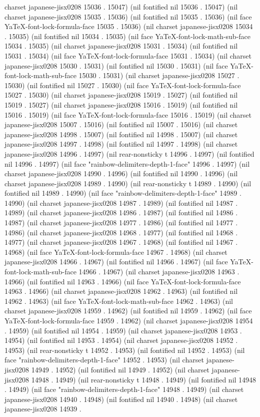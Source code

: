 charset japanese-jisx0208 15036 . 15047) (nil fontified nil 15036 . 15047) (nil charset japanese-jisx0208 15035 . 15036) (nil fontified nil 15035 . 15036) (nil face YaTeX-font-lock-formula-face 15035 . 15036) (nil charset japanese-jisx0208 15034 . 15035) (nil fontified nil 15034 . 15035) (nil face YaTeX-font-lock-math-sub-face 15034 . 15035) (nil charset japanese-jisx0208 15031 . 15034) (nil fontified nil 15031 . 15034) (nil face YaTeX-font-lock-formula-face 15031 . 15034) (nil charset japanese-jisx0208 15030 . 15031) (nil fontified nil 15030 . 15031) (nil face YaTeX-font-lock-math-sub-face 15030 . 15031) (nil charset japanese-jisx0208 15027 . 15030) (nil fontified nil 15027 . 15030) (nil face YaTeX-font-lock-formula-face 15027 . 15030) (nil charset japanese-jisx0208 15019 . 15027) (nil fontified nil 15019 . 15027) (nil charset japanese-jisx0208 15016 . 15019) (nil fontified nil 15016 . 15019) (nil face YaTeX-font-lock-formula-face 15016 . 15019) (nil charset japanese-jisx0208 15007 . 15016) (nil fontified nil 15007 . 15016) (nil charset japanese-jisx0208 14998 . 15007) (nil fontified nil 14998 . 15007) (nil charset japanese-jisx0208 14997 . 14998) (nil fontified nil 14997 . 14998) (nil charset japanese-jisx0208 14996 . 14997) (nil rear-nonsticky t 14996 . 14997) (nil fontified nil 14996 . 14997) (nil face "rainbow-delimiters-depth-1-face" 14996 . 14997) (nil charset japanese-jisx0208 14990 . 14996) (nil fontified nil 14990 . 14996) (nil charset japanese-jisx0208 14989 . 14990) (nil rear-nonsticky t 14989 . 14990) (nil fontified nil 14989 . 14990) (nil face "rainbow-delimiters-depth-1-face" 14989 . 14990) (nil charset japanese-jisx0208 14987 . 14989) (nil fontified nil 14987 . 14989) (nil charset japanese-jisx0208 14986 . 14987) (nil fontified nil 14986 . 14987) (nil charset japanese-jisx0208 14977 . 14986) (nil fontified nil 14977 . 14986) (nil charset japanese-jisx0208 14968 . 14977) (nil fontified nil 14968 . 14977) (nil charset japanese-jisx0208 14967 . 14968) (nil fontified nil 14967 . 14968) (nil face YaTeX-font-lock-formula-face 14967 . 14968) (nil charset japanese-jisx0208 14966 . 14967) (nil fontified nil 14966 . 14967) (nil face YaTeX-font-lock-math-sub-face 14966 . 14967) (nil charset japanese-jisx0208 14963 . 14966) (nil fontified nil 14963 . 14966) (nil face YaTeX-font-lock-formula-face 14963 . 14966) (nil charset japanese-jisx0208 14962 . 14963) (nil fontified nil 14962 . 14963) (nil face YaTeX-font-lock-math-sub-face 14962 . 14963) (nil charset japanese-jisx0208 14959 . 14962) (nil fontified nil 14959 . 14962) (nil face YaTeX-font-lock-formula-face 14959 . 14962) (nil charset japanese-jisx0208 14954 . 14959) (nil fontified nil 14954 . 14959) (nil charset japanese-jisx0208 14953 . 14954) (nil fontified nil 14953 . 14954) (nil charset japanese-jisx0208 14952 . 14953) (nil rear-nonsticky t 14952 . 14953) (nil fontified nil 14952 . 14953) (nil face "rainbow-delimiters-depth-1-face" 14952 . 14953) (nil charset japanese-jisx0208 14949 . 14952) (nil fontified nil 14949 . 14952) (nil charset japanese-jisx0208 14948 . 14949) (nil rear-nonsticky t 14948 . 14949) (nil fontified nil 14948 . 14949) (nil face "rainbow-delimiters-depth-1-face" 14948 . 14949) (nil charset japanese-jisx0208 14940 . 14948) (nil fontified nil 14940 . 14948) (nil charset japanese-jisx0208 14939 . 